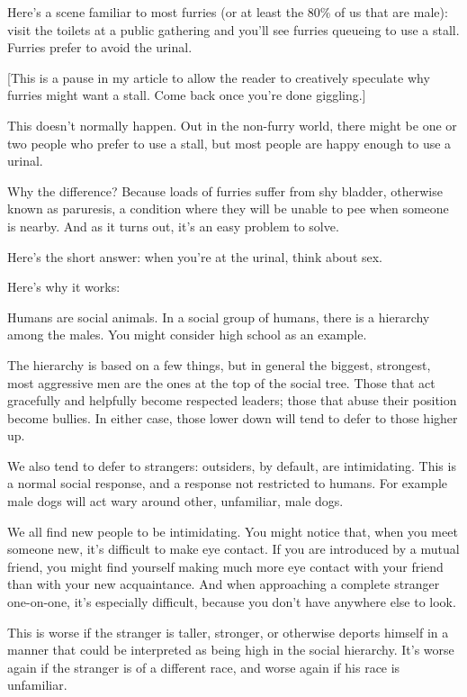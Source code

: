 
Here's a scene familiar to most furries (or at least the 80\% of us that are male): visit the toilets at a public gathering and you'll see furries queueing to use a stall. Furries prefer to avoid the urinal.

[This is a pause in my article to allow the reader to creatively speculate why furries might want a stall. Come back once you're done giggling.]

This doesn't normally happen. Out in the non-furry world, there might be one or two people who prefer to use a stall, but most people are happy enough to use a urinal.

Why the difference? Because loads of furries suffer from shy bladder, otherwise known as paruresis, a condition where they will be unable to pee when someone is nearby. And as it turns out, it's an easy problem to solve.

Here's the short answer: when you're at the urinal, think about sex.

Here's why it works:

Humans are social animals. In a social group of humans, there is a hierarchy among the males. You might consider high school as an example.

The hierarchy is based on a few things, but in general the biggest, strongest, most aggressive men are the ones at the top of the social tree. Those that act gracefully and helpfully become respected leaders; those that abuse their position become bullies. In either case, those lower down will tend to defer to those higher up.

We also tend to defer to strangers: outsiders, by default, are intimidating. This is a normal social response, and a response not restricted to humans. For example male dogs will act wary around other, unfamiliar, male dogs.

We all find new people to be intimidating. You might notice that, when you meet someone new, it's difficult to make eye contact. If you are introduced by a mutual friend, you might find yourself making much more eye contact with your friend than with your new acquaintance. And when approaching a complete stranger one-on-one, it's especially difficult, because you don't have anywhere else to look.

This is worse if the stranger is taller, stronger, or otherwise deports himself in a manner that could be interpreted as being high in the social hierarchy. It's worse again if the stranger is of a different race, and worse again if his race is unfamiliar.

